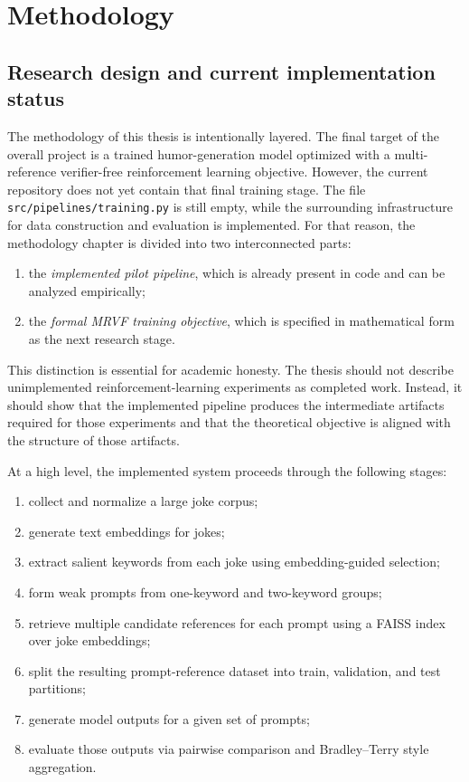 \documentclass[14pt,a4paper]{extreport}
\begin{document}
\chapter{Methodology}

\section{Research design and current implementation status}

The methodology of this thesis is intentionally layered. The final target of the overall project is a trained humor-generation model optimized with a multi-reference verifier-free reinforcement learning objective. However, the current repository does not yet contain that final training stage. The file \texttt{src/pipelines/training.py} is still empty, while the surrounding infrastructure for data construction and evaluation is implemented. For that reason, the methodology chapter is divided into two interconnected parts:
\begin{enumerate}
  \item the \emph{implemented pilot pipeline}, which is already present in code and can be analyzed empirically;
  \item the \emph{formal MRVF training objective}, which is specified in mathematical form as the next research stage.
\end{enumerate}

This distinction is essential for academic honesty. The thesis should not describe unimplemented reinforcement-learning experiments as completed work. Instead, it should show that the implemented pipeline produces the intermediate artifacts required for those experiments and that the theoretical objective is aligned with the structure of those artifacts.

At a high level, the implemented system proceeds through the following stages:
\begin{enumerate}
  \item collect and normalize a large joke corpus;
  \item generate text embeddings for jokes;
  \item extract salient keywords from each joke using embedding-guided selection;
  \item form weak prompts from one-keyword and two-keyword groups;
  \item retrieve multiple candidate references for each prompt using a FAISS index over joke embeddings;
  \item split the resulting prompt-reference dataset into train, validation, and test partitions;
  \item generate model outputs for a given set of prompts;
  \item evaluate those outputs via pairwise comparison and Bradley--Terry style aggregation.
\end{enumerate}
\end{document}
